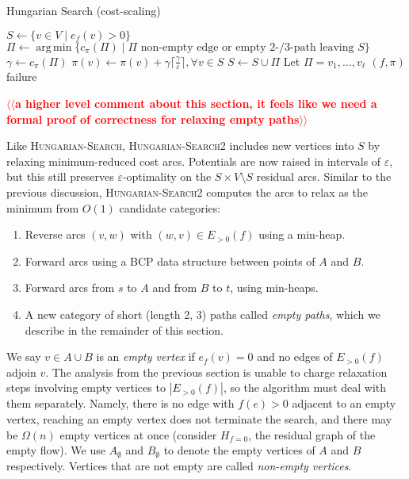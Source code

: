 \documentclass[11pt]{article}
\makeatletter
\def\eps{\varepsilon}
\DeclareMathOperator*{\argmin}{arg\,min}
\theoremstyle{plain}
\numberwithin{figure}{section}
\def\n@te#1{\textsf{\boldmath \textbf{$\langle\!\langle$#1$\rangle\!\rangle$}}\leavevmode}
\def\note#1{\textcolor{red}{\n@te{#1}}}
\makeatother
\begin{document}
\begin{algorithm}
\caption{Hungarian Search (cost-scaling)}
\begin{algorithmic}[1]
	\State $S \gets \{v \in V \mid e_f(v) > 0\}$
	\Repeat
		\State $\Pi \gets \argmin\{c_\pi(\Pi) \mid \text{$\Pi$ non-empty edge or empty 2-/3-path leaving $S$}\}$
			\label{line:hs_relaxation}
		\State $\gamma \gets c_\pi(\Pi)$
			\State $\pi(v) \gets \pi(v) + \gamma\lceil\frac{\gamma}{\eps}\rceil, \forall v \in S$
		\EndIf
		\State $S \gets S \cup \Pi$
		\Statex %
		\State Let $\Pi = v_1, \ldots, v_\ell$
		 
			\State\Return $(f, \pi)$
		\EndIf
	\State\Return failure
\EndFunction
\end{algorithmic}
\end{algorithm}


\note{a higher level comment about this section, it feels like we need a formal proof of correctness for relaxing empty paths}

Like \textsc{Hungarian-Search}, \textsc{Hungarian-Search2} includes new
vertices into $S$ by relaxing minimum-reduced cost arcs.
Potentials are now raised in intervals of $\eps$, but this still preserves
$\eps$-optimality on the $S \times V \setminus S$ residual arcs.
Similar to the previous discussion, \textsc{Hungarian-Search2} computes the
arcs to relax as the minimum from $O(1)$ candidate categories:
\begin{enumerate}
\item Reverse arcs $(v, w)$ with $(w, v) \in E_{>0}(f)$ using a min-heap.
\item Forward arcs using a BCP data structure between points of $A$ and $B$.
\item Forward arcs from $s$ to $A$ and from $B$ to $t$, using min-heaps.
\item A new category of short (length 2, 3) paths called \emph{empty paths},
	which we describe in the remainder of this section.
\end{enumerate}

We say $v \in A \cup B$ is an \emph{empty vertex} if $e_f(v) = 0$ and no edges
of $E_{>0}(f)$ adjoin $v$.
The analysis from the previous section is unable to charge relaxation steps
involving empty vertices to $|E_{>0}(f)|$, so the algorithm must deal with them
separately.
Namely, there is no edge with $f(e) > 0$ adjacent to an empty vertex,
reaching an empty vertex does not terminate the search, and there may be
$\Omega(n)$ empty vertices at once (consider $H_{f = 0}$, the residual graph
of the empty flow).
We use $A_\emptyset$ and $B_\emptyset$ to denote the empty vertices of $A$ and
$B$ respectively.
Vertices that are not empty are called \emph{non-empty vertices}.
\end{document}
